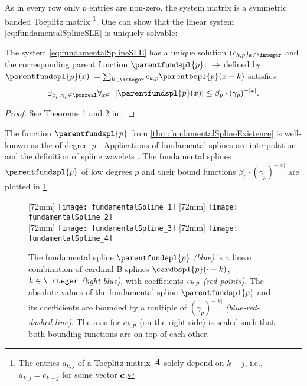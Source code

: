 As in every row only $p$ entries are non-zero,
the system matrix is a symmetric banded Toeplitz matrix%
\footnote{%
  The entries $a_{k,j}$ of a Toeplitz matrix ${\boldsymbol{A}}$
  solely depend on $k - j$, i.e.,
  $a_{k,j} = c_{k-j}$ for some vector ${\boldsymbol{c}}$.%
}.
One can show that the linear system \eqref{eq:fundamentalSplineSLE}
is uniquely solvable:

\begin{theorem}
  \label{thm:fundamentalSplineExistence}
  The system \eqref{eq:fundamentalSplineSLE} has a unique solution
  $(\fundsplcoeff{k}{p})_{k \in \integer}$ and the corresponding parent function
  $\parentfundspl{p}\colon \real \to \real$ defined by
  $\parentfundspl{p}(x) :=
  \sum_{k \in \integer} \fundsplcoeff{k}{p} \parentbspl{p}(x - k)$
  satisfies
  \begin{equation}
    \exfalarge{\beta_p, \gamma_p \in \posreal}{x \in \real}{
      |\parentfundspl{p}(x)|
      \le \beta_p \cdot (\gamma_p)^{-|x|}.
    }
  \end{equation}
\end{theorem}

\begin{proof}
  See Theorems 1 and 2 in \cite{Schoenberg72Cardinal}.
\end{proof}

The function $\parentfundspl{p}$ from \cref{thm:fundamentalSplineExistence}
is well-known as the  of degree~$p$
.
Applications of fundamental splines are interpolation and
the definition of spline wavelets \cite{Chui92Introduction}.
The fundamental splines $\parentfundspl{p}$ of low degrees $p$ and
their bound functions $\beta_p \cdot (\gamma_p)^{-|x|}$
are plotted in \cref{fig:fundamentalSpline}.

\begin{figure}
  [72mm]{%
    \texttt{[image: fundamentalSpline\_1]}%
  }%
  \hfill%
  [72mm]{%
    \texttt{[image: fundamentalSpline\_2]}%
  }\\[4mm]%
  [72mm]{%
    \texttt{[image: fundamentalSpline\_3]}%
  }%
  \hfill%
  [72mm]{%
    \texttt{[image: fundamentalSpline\_4]}%
  }%
  \caption[%
    Fundamental splines and their B-spline coefficients%
  ]{%
    The fundamental spline $\parentfundspl{p}$ \emph{\textcolor{C0}{(blue)}}
    is a linear combination of cardinal B-splines $\cardbspl{p}({\cdot} - k)$,
    $k \in \integer$ \emph{\textcolor{C0!50}{(light blue)}},
    with coefficients $\fundsplcoeff{k}{p}$ \emph{\textcolor{C1}{(red points)}}.
    The absolute values of the fundamental spline $\parentfundspl{p}$ and
    its coefficients are bounded by a multiple of $(\gamma_p)^{-|k|}$
    \emph{(\textcolor{C0}{blue}-\textcolor{C1}{red}-dashed line)}.
    The axis for $\fundsplcoeff{k}{p}$ (on the right side) is scaled such that
    both bounding functions are on top of each other.%
  }%
  \label{fig:fundamentalSpline}%
\end{figure}

